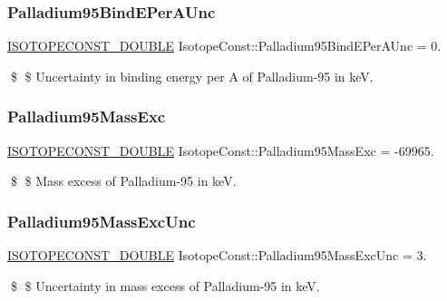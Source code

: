 \subsubsection{\texorpdfstring{Palladium95\+Bind\+E\+Per\+A\+Unc}{Palladium95BindEPerAUnc}}
{\footnotesize\ttfamily \mbox{\hyperlink{group___isotope_const-_macros_ga8f45a7272ce02c0b4c65c44636ed719a}{I\+S\+O\+T\+O\+P\+E\+C\+O\+N\+S\+T\+\_\+\+D\+O\+U\+B\+LE}} Isotope\+Const\+::\+Palladium95\+Bind\+E\+Per\+A\+Unc = 0.}

\$ \$ Uncertainty in binding energy per A of Palladium-\/95 in keV. \mbox{\label{group___isotope_const-_palladium-_pd95_ga655634a609ae77a1ee6e126be92ca706}} 
\subsubsection{\texorpdfstring{Palladium95\+Mass\+Exc}{Palladium95MassExc}}
{\footnotesize\ttfamily \mbox{\hyperlink{group___isotope_const-_macros_ga8f45a7272ce02c0b4c65c44636ed719a}{I\+S\+O\+T\+O\+P\+E\+C\+O\+N\+S\+T\+\_\+\+D\+O\+U\+B\+LE}} Isotope\+Const\+::\+Palladium95\+Mass\+Exc = -\/69965.}

\$ \$ Mass excess of Palladium-\/95 in keV. \mbox{\label{group___isotope_const-_palladium-_pd95_ga0609e24d8743b8181c627e89adc84810}} 
\subsubsection{\texorpdfstring{Palladium95\+Mass\+Exc\+Unc}{Palladium95MassExcUnc}}
{\footnotesize\ttfamily \mbox{\hyperlink{group___isotope_const-_macros_ga8f45a7272ce02c0b4c65c44636ed719a}{I\+S\+O\+T\+O\+P\+E\+C\+O\+N\+S\+T\+\_\+\+D\+O\+U\+B\+LE}} Isotope\+Const\+::\+Palladium95\+Mass\+Exc\+Unc = 3.}

\$ \$ Uncertainty in mass excess of Palladium-\/95 in keV. \mbox{\label{group___isotope_const-_palladium-_pd95_gaaf8b9ba917e9bd837857ff5aa55ce670}} 
